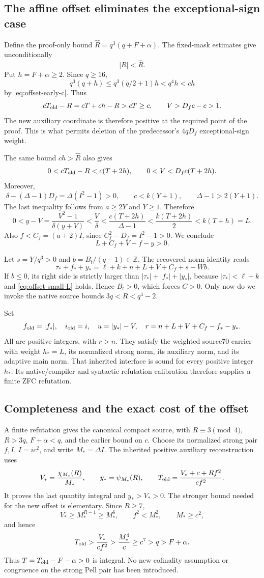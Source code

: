 \subsection{The affine offset eliminates the exceptional-sign case}

Define the proof-only bound $\widehat R=q^3(q+F+\alpha)$.
The fixed-mask estimates give unconditionally
\[
 |R|<\widehat R.
\]
Put $h=F+\alpha\ge2$. Since $q\ge16$,
\[
 q^3(q+h)\le q^3(q/2+1)h<q^4h<ch
\]
by \eqref{eq:offset-early-c}. Thus
\[
 cT_{\rm old}-R=cT+ch-R>cT\ge c,
 \qquad V>D_fc-c>1.
\]
The new auxiliary coordinate is therefore positive at the required point
of the proof. This is what permits deletion of the predecessor's
$4qD_f$ exceptional-sign weight.

The same bound $ch>\widehat R$ also gives
\[
 0<cT_{\rm old}-R<c(T+2h),\qquad 0<V<D_fc(T+2h).
\]
Moreover,
\[
 \delta-(\Delta-1)D_f=\Delta(I^2-1)>0,
 \qquad c<k(Y+1),\qquad \Delta-1>2(Y+1).
\]
The last inequality follows from $a\ge2Y$ and $Y\ge1$. Therefore
\[
 0<y-V=\frac{V^2-1}{\delta(y+V)}<\frac{V}{\delta}
 <\frac{c(T+2h)}{\Delta-1}<\frac{k(T+2h)}2<k(T+h)=L.
\]
Also $f<C_f=(a+2)I$, since $C_f^2-D_f=I^2-1>0$. We conclude
\begin{equation}\label{eq:offset-small-L}
 L+C_f+V-f-y>0.
\end{equation}

Let $s=Y/q^3>0$ and $b=B_t/(q-1)\in\mathbb Z$. The recovered norm
identity reads
\[
 \tau_*+f_*+y_*=\ell+k+n+L+V+C_f+s-Wb.
\]
If $b\le0$, its right side is strictly larger than
$|\tau_*|+|f_*|+|y_*|$, because $|\tau_*|<\ell+k$ and
\eqref{eq:offset-small-L} holds. Hence $B_t>0$, which forces $C>0$.
Only now do we invoke the native source bounds $3q<R<q^4-2$.

Set
\[
 f_{\rm old}=|f_*|,\quad i_{\rm old}=i,\quad u=|y_*|-V,\quad
 r=n+L+V+C_f-f_*-y_*.
\]
All are positive integers, with $r>n$. They satisfy the weighted source70
carrier with weight $h_*=L$, its normalized strong norm, its auxiliary
norm, and its adaptive main norm. That inherited interface is sound for
every positive integer $h_*$. Its native/compiler and syntactic-refutation
calibration therefore supplies a finite ZFC refutation.

\subsection{Completeness and the exact cost of the offset}

A finite refutation gives the canonical compact source, with
$R\equiv3\pmod4$, $R>3q$, $F+\alpha<q$, and the earlier bound on $c$.
Choose its normalized strong pair $f,I$, $I=ic^2$, and write
$M_*=\Delta I$. The inherited positive auxiliary reconstruction uses
\[
 V_* =\frac{\chi_{M_*}(R)}{M_*},\qquad
 y_* =\psi_{M_*}(R),\qquad
 T_{\rm old}=\frac{V_*+c+Rf^2}{cf^2}.
\]
It proves the last quantity integral and $y_*>V_*>0$. The stronger bound
needed for the new offset is elementary. Since $R\ge7$,
\[
 V_*\ge M_*^{R-1}\ge M_*^6,\qquad f^2<M_*^2,\qquad M_*\ge c^2,
\]
and hence
\[
 T_{\rm old}>\frac{V_*}{cf^2}>\frac{M_*^4}{c}\ge c^7>q>F+\alpha.
\]
Thus $T=T_{\rm old}-F-\alpha>0$ is integral. No new cofinality assumption
or congruence on the strong Pell pair has been introduced.

